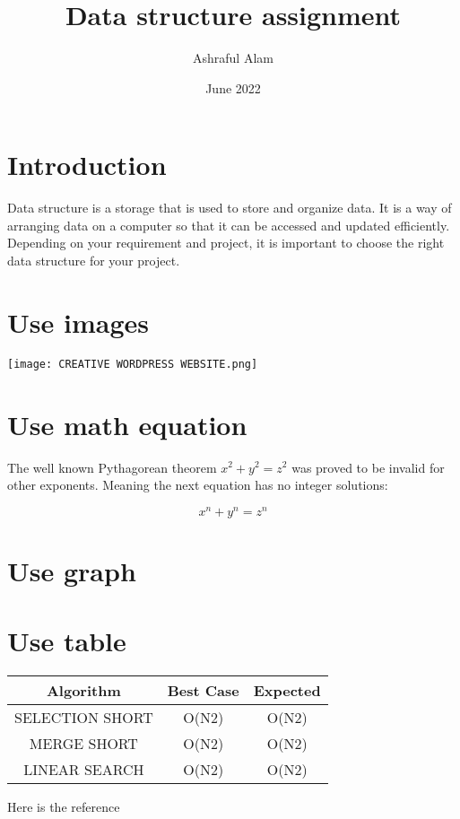 \documentclass{article}
\title{Data structure assignment}
\author{Ashraful Alam }
\date{June 2022}
\begin{document}
\maketitle

\section{Introduction}
Data structure is a storage that is used to store and organize data. It is a way of arranging data on a computer so that it can be accessed and updated efficiently. Depending on your requirement and project, it is important to choose the right data structure for your project.
\section{Use images}
\texttt{[image: CREATIVE WORDPRESS WEBSITE.png]}
\section{Use math equation}
The well known Pythagorean theorem \(x^2 + y^2 = z^2\) was 
proved to be invalid for other exponents. 
Meaning the next equation has no integer solutions:

\[ x^n + y^n = z^n \]
\section{Use graph}
\section{Use table}
\begin{tabular}{|c|c|c|}
\hline
  Algorithm & Best Case & Expected\\
  \hline
   SELECTION SHORT & O(N2) & O(N2)\\
   \hline
   MERGE SHORT & O(N2) & O(N2)\\
   \hline
   LINEAR SEARCH & O(N2) & O(N2)\\
   \hline
\end{tabular}

Here is the reference \cite{shkir2021tailoring}


\end{document}
